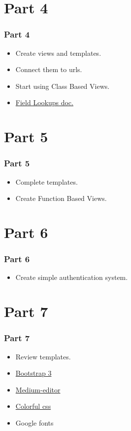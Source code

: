 \documentclass{beamer}
\begin{document}
\section{Part 4}
\begin{frame}[fragile]
\frametitle{Part 4}
\begin{itemize}
\item Create views and templates.
\item Connect them to urls.
\item Start using Class Based Views.
\item \href{https://docs.djangoproject.com/en/2.1/ref/models/querysets/#id4}{Field Lookups doc.}
\end{itemize}

\end{frame}

\section{Part 5}
\begin{frame}
\frametitle{Part 5}
\begin{itemize}
\item Complete templates.
\item Create Function Based Views.

\end{itemize}
\end{frame}


\section{Part 6}
\begin{frame}
\frametitle{Part 6}
\begin{itemize}
\item Create simple authentication system.

\end{itemize}
\end{frame}

\section{Part 7}
\begin{frame}[fragile]
\frametitle{Part 7}
\begin{itemize}
\item Review templates.
\item
\href{https://getbootstrap.com/docs/3.3/getting-started/}{Bootstrap 3}

\item
\href{https://github.com/yabwe/medium-editor}{Medium-editor}

\item
\href{https://codepen.io/thapliyalshivam/pen/dvgXVO}{Colorful css}
\item Google fonts
\end{itemize}
\end{frame}
\end{document}
